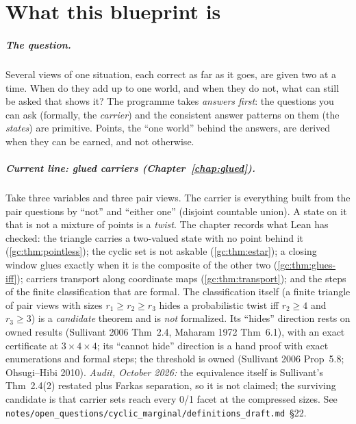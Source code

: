 \chapter*{What this blueprint is}

\paragraph{The question.} Several views of one situation, each correct as far
as it goes, are given two at a time. When do they add up to one world, and when
they do not, what can still be asked that shows it? The programme takes
\emph{answers first}: the questions you can ask (formally, the
\emph{carrier}) and the consistent answer patterns on them (the
\emph{states}) are primitive. Points, the ``one world'' behind the answers, are
derived when they can be earned, and not otherwise.

\paragraph{Current line: glued carriers (Chapter~\ref{chap:glued}).} Take
three variables and three pair views. The carrier is everything built from the
pair questions by ``not'' and ``either one'' (disjoint countable union). A
state on it that is not a mixture of points is a \emph{twist}. The chapter
records what Lean has checked: the triangle carries a two-valued state with no
point behind it (\ref{gc:thm:pointless}); the cyclic set is not askable
(\ref{gc:thm:estar}); a closing window glues exactly when it is the composite of
the other two (\ref{gc:thm:glues-iff}); carriers transport along coordinate maps
(\ref{gc:thm:transport}); and the steps of the finite classification that are
formal. The classification itself (a finite triangle of pair views with sizes
$r_1\ge r_2\ge r_3$ hides a probabilistic twist iff $r_2\ge4$ and $r_3\ge3$) is a
\emph{candidate} theorem and is \emph{not} formalized. Its ``hides'' direction
rests on owned results (Sullivant 2006 Thm~2.4, Maharam 1972 Thm~6.1), with an
exact certificate at $3\times4\times4$; its ``cannot hide'' direction is a hand
proof with exact enumerations and formal steps; the threshold is owned
(Sullivant 2006 Prop~5.8; Ohsugi--Hibi 2010). \emph{Audit, October 2026:} the
equivalence itself is Sullivant's Thm~2.4(2) restated plus Farkas separation, so it
is not claimed; the surviving candidate is that carrier sets reach every 0/1 facet
at the compressed sizes. See
\texttt{notes/open\_questions/cyclic\_marginal/definitions\_draft.md}~\S22.

